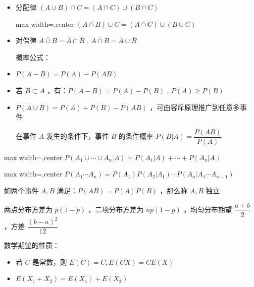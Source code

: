 \documentclass[twocolumn,10pt]{ctexart}
\begin{document}
\begin{itemize}
\item 分配律 $(A\cup B)\cap C=(A\cap C)\cup(B\cap C)$

\begin{adjustbox}{max width=\linewidth,center}
$(A\cap B)\cup C=(A\cap C)\cup(B\cup C)$
\end{adjustbox}
\end{itemize}

\begin{itemize}
\item 对偶律 $\overline{A\cup B}=\overline A\cap \overline B$ , $\overline{A\cap B}=\overline A\cup \overline B$

概率公式：
\end{itemize}

\begin{itemize}
\item $P(A-B)=P(A)-P(AB)$
\item 若 $B\subset A$ ，有：$P(A-B)=P(A)-P(B)$ , $P(A)\ge P(B)$
\item $P(A\cup B)=P(A)+P(B)-P(AB)$ ，可由容斥原理推广到任意多事件

在事件 $A$ 发生的条件下，事件 $B$ 的条件概率 $P(B|A)=\dfrac{P(AB)}{P(A)}$
\end{itemize}

\begin{adjustbox}{max width=\linewidth,center}
$P(A_1\cup\cdots\cup A_n|A)=P(A_1|A)+\cdots+P(A_n|A)$
\end{adjustbox}

\begin{adjustbox}{max width=\linewidth,center}
$P(A_1\cdots A_n)=P(A_1)P(A_2|A_1)\cdots P(A_n|A_1\cdots A_{n-1})$
\end{adjustbox}

如两个事件 $A,B$ 满足：$P(AB)=P(A)P(B)$ ，那么称 $A,B$ 独立

两点分布方差为 $p(1-p)$ ，二项分布方差为 $np(1-p)$ ，均匀分布期望 $\dfrac{a+b}2$ ，方差 $\dfrac{(b-a)^2}{12}$

数学期望的性质：

\begin{itemize}
\item 若 $C$ 是常数，则 $E(C)=C,E(CX)=CE(X)$
\end{itemize}

\begin{itemize}
\item $E(X_1+X_2)=E(X_1)+E(X_2)$
\end{itemize}
\end{document}
